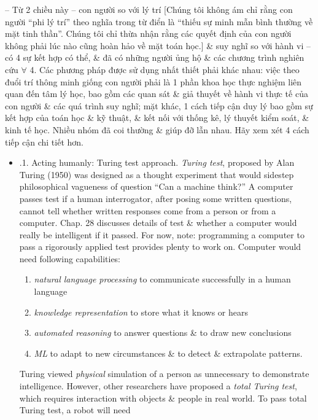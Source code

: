 \documentclass{article}
\begin{document}
\begin{itemize}
\begin{itemize}
\begin{itemize}
			--  Từ 2 chiều này -- con người so với lý trí [Chúng tôi không ám chỉ rằng con người ``phi lý trí'' theo nghĩa trong từ điển là ``thiếu sự minh mẫn bình thường về mặt tinh thần''. Chúng tôi chỉ thừa nhận rằng các quyết định của con người không phải lúc nào cũng hoàn hảo về mặt toán học.] \& suy nghĩ so với hành vi -- có 4 sự kết hợp có thể, \& đã có những người ủng hộ \& các chương trình nghiên cứu $\forall$ 4. Các phương pháp được sử dụng nhất thiết phải khác nhau: việc theo đuổi trí thông minh giống con người phải là 1 phần khoa học thực nghiệm liên quan đến tâm lý học, bao gồm các quan sát \& giả thuyết về hành vi thực tế của con người \& các quá trình suy nghĩ; mặt khác, 1 cách tiếp cận duy lý bao gồm sự kết hợp của toán học \& kỹ thuật, \& kết nối với thống kê, lý thuyết kiểm soát, \& kinh tế học. Nhiều nhóm đã coi thường \& giúp đỡ lẫn nhau. Hãy xem xét 4 cách tiếp cận chi tiết hơn.
			\begin{itemize}
				\item {.1. Acting humanly: Turing test approach.} {\it Turing test}, proposed by {\sc Alan Turing} (1950) was designed as a thought experiment that would sidestep philosophical vagueness of question ``Can a machine think?'' A computer passes test if a human interrogator, after posing some written questions, cannot tell whether written responses come from a person or from a computer. Chap. 28 discusses details of test \& whether a computer would really be intelligent if it passed. For now, note: programming a computer to pass a rigorously applied test provides plenty to work on. Computer would need following capabilities:
				\begin{enumerate}
					\item {\it natural language processing} to communicate successfully in a human language
					\item {\it knowledge representation} to store what it knows or hears
					\item {\it automated reasoning} to answer questions \& to draw new conclusions
					\item {\it ML} to adapt to new circumstances \& to detect \& extrapolate patterns.
				\end{enumerate}
				{\sc Turing} viewed {\it physical} simulation of a person as unnecessary to demonstrate intelligence. However, other researchers have proposed a {\it total Turing test}, which requires interaction with objects \& people in real world. To pass total Turing test, a robot will need
				\begin{enumerate}

\end{enumerate}
\end{itemize}
\end{itemize}
\end{itemize}
\end{itemize}
\end{document}
